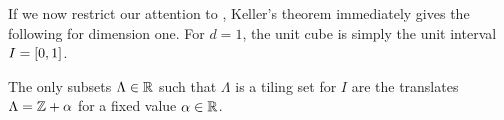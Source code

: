\documentclass[../thesis.tex]{subfiles}
\begin{document}
If we now restrict our attention to , Keller's theorem immediately gives the following for dimension one.  For $d=1$, the unit cube is simply the unit interval $I = [0,1]$. %

\begin{lemma}\label{lem:tiling_unit_1d}
    The only subsets $\Lambda \in \mathbb{R}$ such that $\Lambda$ is a tiling set for $I$ are the translates $\Lambda = \mathbb{Z} +\alpha$ for a fixed value $\alpha\in \mathbb{R}$. 
\end{lemma}
\end{document}
